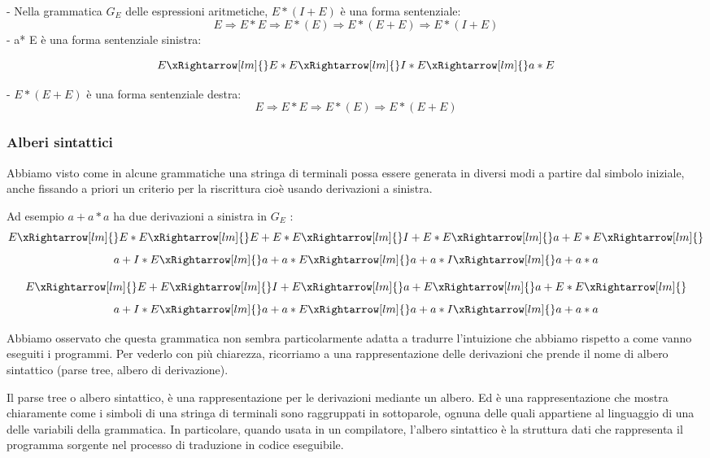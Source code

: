 - Nella grammatica $G_{E}$ delle espressioni aritmetiche, $E *(I+E)$ è una forma sentenziale:
$$
E \Rightarrow E * E \Rightarrow E *(E) \Rightarrow E *(E+E) \Rightarrow E *(I+E)
$$
- a* E è una forma sentenziale sinistra:

$$
E \xRightarrow[lm]{} E * E \xRightarrow[lm]{} I * E \xRightarrow[lm]{} a * E
$$

- $E *(E+E)$ è una forma sentenziale destra:
$$
E \Rightarrow E * E \Rightarrow E *(E) \Rightarrow E *(E+E)
$$

\subsubsection{Alberi sintattici}

Abbiamo visto come in alcune grammatiche una stringa di terminali possa essere generata in diversi modi a partire dal simbolo iniziale, anche fissando a priori un criterio per la riscrittura cioè usando derivazioni a sinistra.

Ad esempio $a+a * a$ ha due derivazioni a sinistra in $G_{E}$ :
$$
E \xRightarrow[lm]{} E * E \xRightarrow[lm]{} E + E * E \xRightarrow[lm]{} I + E * E \xRightarrow[lm]{} a + E * E \xRightarrow[lm]{}
$$
$$
a + I * E \xRightarrow[lm]{} a + a * E \xRightarrow[lm]{} a + a * I \xRightarrow[lm]{} a + a * a
$$

\vspace{3mm}

$$
E \xRightarrow[lm]{} E + E \xRightarrow[lm]{} I + E \xRightarrow[lm]{} a + E \xRightarrow[lm]{} a + E * E \xRightarrow[lm]{}
$$
$$
a + I * E \xRightarrow[lm]{} a + a * E \xRightarrow[lm]{} a + a * I \xRightarrow[lm]{} a + a * a
$$

Abbiamo osservato che questa grammatica non sembra particolarmente adatta a tradurre l’intuizione che abbiamo rispetto a come vanno eseguiti i programmi.
Per vederlo con più chiarezza, ricorriamo a una rappresentazione delle derivazioni che prende il nome di albero sintattico (parse tree, albero di derivazione).

Il parse tree o albero sintattico, è una rappresentazione per le derivazioni mediante un albero. Ed è una rappresentazione che mostra chiaramente come i simboli di una stringa di terminali sono raggruppati in sottoparole, ognuna delle quali appartiene al linguaggio di una delle variabili della grammatica.
In particolare, quando usata in un compilatore, l’albero sintattico è la struttura dati che rappresenta il programma sorgente nel processo di traduzione in codice eseguibile.

